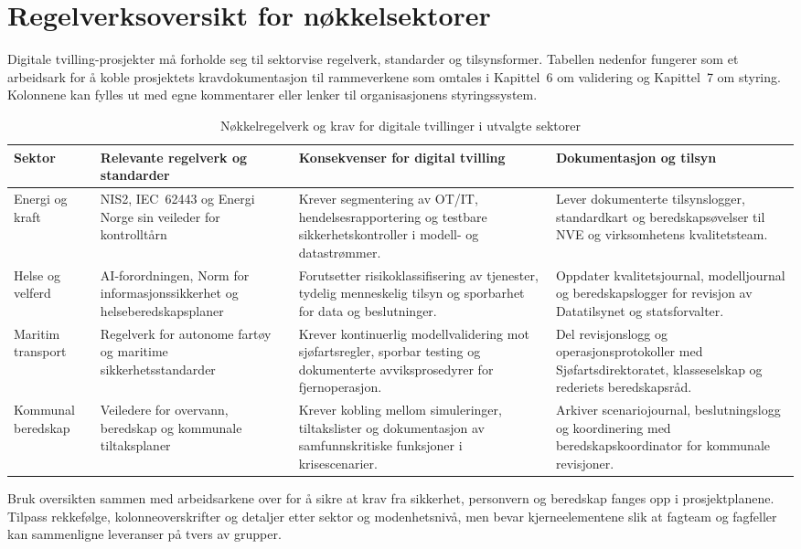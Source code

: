 \section{Regelverksoversikt for nøkkelsektorer}
Digitale tvilling-prosjekter må forholde seg til sektorvise regelverk, standarder og tilsynsformer.
Tabellen nedenfor fungerer som et arbeidsark for å koble prosjektets kravdokumentasjon til
rammeverkene som omtales i Kapittel~6 om validering og Kapittel~7 om styring. Kolonnene kan fylles
ut med egne kommentarer eller lenker til organisasjonens styringssystem.

\begin{table}[htbp]
    \centering
    \caption{Nøkkelregelverk og krav for digitale tvillinger i utvalgte sektorer}
    \label{tab:appendiks-regelverk}
    \begin{tabular}{p{3.0cm}p{4.8cm}p{4.8cm}p{3.0cm}}
        \toprule
        \textbf{Sektor} & \textbf{Relevante regelverk og standarder} & \textbf{Konsekvenser for digital tvilling} & \textbf{Dokumentasjon og tilsyn} \\
        \midrule
        Energi og kraft & NIS2, IEC~62443 og Energi Norge sin veileder for kontrolltårn\citep{eu2022nis2,iec62443-2-1,energinorge2023beredskap} & Krever segmentering av OT/IT, hendelsesrapportering og testbare sikkerhetskontroller i modell- og datastrømmer. & Lever dokumenterte tilsynslogger, standardkart og beredskapsøvelser til NVE og virksomhetens kvalitetsteam. \\
        \addlinespace
        Helse og velferd & AI-forordningen, Norm for informasjonssikkerhet og helseberedskapsplaner\citep{eu2024aiact,norm2023,helsedir2023beredskap} & Forutsetter risikoklassifisering av tjenester, tydelig menneskelig tilsyn og sporbarhet for data og beslutninger. & Oppdater kvalitetsjournal, modelljournal og beredskapslogger for revisjon av Datatilsynet og statsforvalter. \\
        \addlinespace
        Maritim transport & Regelverk for autonome fartøy og maritime sikkerhetsstandarder\citep{sdir2023autonomefartoy,dnv2024autonomous,massterly2023operations} & Krever kontinuerlig modellvalidering mot sjøfartsregler, sporbar testing og dokumenterte avviksprosedyrer for fjernoperasjon. & Del revisjonslogg og operasjonsprotokoller med Sjøfartsdirektoratet, klasseselskap og rederiets beredskapsråd. \\
        \addlinespace
        Kommunal beredskap & Veiledere for overvann, beredskap og kommunale tiltaksplaner\citep{nve2022kommunal,dsb2022beredskap,oslo2023overvann} & Krever kobling mellom simuleringer, tiltakslister og dokumentasjon av samfunnskritiske funksjoner i krisescenarier. & Arkiver scenariojournal, beslutningslogg og koordinering med beredskapskoordinator for kommunale revisjoner. \\
        \bottomrule
    \end{tabular}
\end{table}

Bruk oversikten sammen med arbeidsarkene over for å sikre at krav fra sikkerhet, personvern og
beredskap fanges opp i prosjektplanene. Tilpass rekkefølge, kolonneoverskrifter og detaljer etter
sektor og modenhetsnivå, men bevar kjerneelementene slik at fagteam og fagfeller kan sammenligne
leveranser på tvers av grupper.
